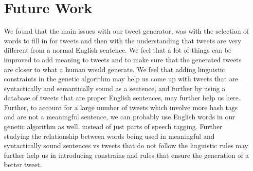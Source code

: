 \section{Future Work}
We found that the main issues with our tweet generator, was with the selection of words to fill in for tweets and then with the understanding that tweets are very different from a normal English sentence. We feel that a lot of things can be improved to add meaning to tweets and to make sure that the generated tweets are closer to what a human would generate. We feel that adding linguistic constraints in the genetic algorithm may help us come up with tweets that are syntactically and semantically sound as a sentence, and further by using a database of tweets that are proper English sentences, may further help us here.
Further, to account for a large number of tweets which involve more hash tags and are not a meaningful sentence, we can probably use English words in our genetic algorithm as well, instead of just parts of speech tagging. Further studying the relationship between words being used in meaningful and syntactically sound sentences vs tweets that do not follow the linguistic rules may further help us in introducing constrains and rules that ensure the generation of a better tweet.